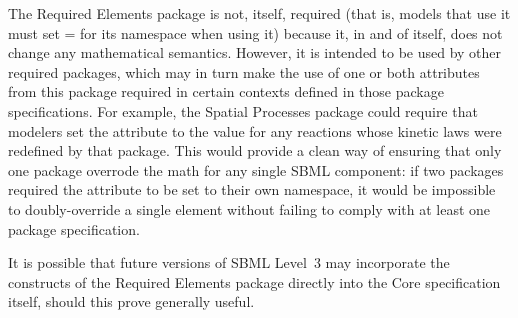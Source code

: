 The Required Elements package is not, itself, required (that is, models that use it must set = for its namespace when using it) because it, in and of itself, does not change any mathematical semantics.  However, it is intended to be used by other required packages, which may in turn make the use of one or both attributes from this package required in certain contexts defined in those package specifications. For example, the Spatial Processes package could require that modelers set the attribute  to the value  for any reactions whose kinetic laws were redefined by that package. This would provide a clean way of ensuring that only one package overrode the math for any single SBML component: if two packages required the  attribute to be set to their own namespace, it would be impossible to doubly-override a single element without failing to comply with at least one package specification.

It is possible that future versions of SBML Level~3 may incorporate the constructs of the Required Elements package directly into the Core specification itself, should this prove generally useful.
